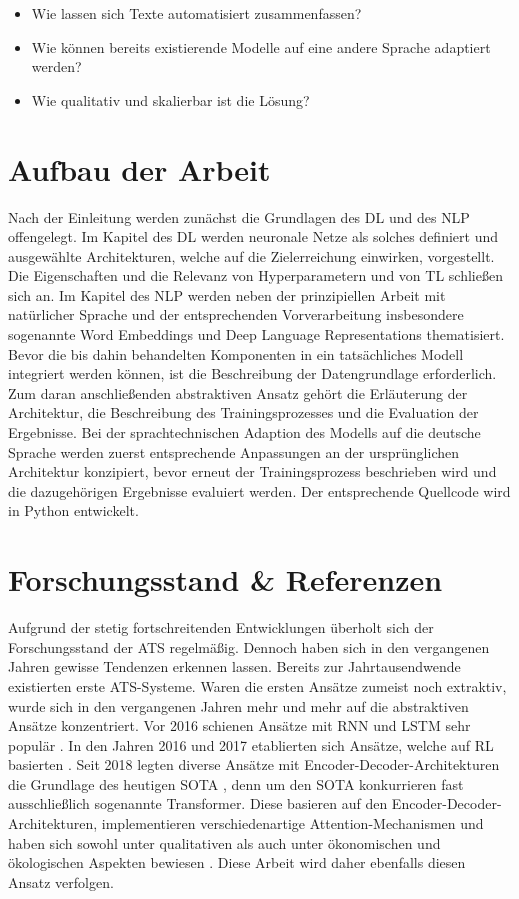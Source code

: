 \begin{itemize}
	\item Wie lassen sich Texte automatisiert zusammenfassen?
	\item Wie können bereits existierende Modelle auf eine andere Sprache adaptiert werden?
	\item Wie qualitativ und skalierbar ist die Lösung?
\end{itemize}
\newpage


\section{Aufbau der Arbeit}
\noindent
Nach der Einleitung werden zunächst die Grundlagen des \ac{DL} und des \ac{NLP} offengelegt. Im Kapitel des \ac{DL} werden neuronale Netze als solches definiert und ausgewählte Architekturen, welche auf die Zielerreichung einwirken, vorgestellt. Die Eigenschaften und die Relevanz von Hyperparametern und von \ac{TL} schließen sich an. Im Kapitel des \ac{NLP} werden neben der prinzipiellen Arbeit mit natürlicher Sprache und der entsprechenden Vorverarbeitung insbesondere sogenannte Word Embeddings und Deep Language Representations thematisiert.\\

\noindent
Bevor die bis dahin behandelten Komponenten in ein tatsächliches Modell integriert werden können, ist die Beschreibung der Datengrundlage erforderlich. Zum daran anschließenden abstraktiven Ansatz gehört die Erläuterung der Architektur, die Beschreibung des Trainingsprozesses und die Evaluation der Ergebnisse. Bei der sprachtechnischen Adaption des Modells auf die deutsche Sprache werden zuerst entsprechende Anpassungen an der ursprünglichen Architektur konzipiert, bevor erneut der Trainingsprozess beschrieben wird und die dazugehörigen Ergebnisse evaluiert werden. Der entsprechende Quellcode wird in Python entwickelt.


\section{Forschungsstand \& Referenzen}
\noindent
Aufgrund der stetig fortschreitenden Entwicklungen überholt sich der Forschungsstand der \ac{ATS} regelmäßig. Dennoch haben sich in den vergangenen Jahren gewisse Tendenzen erkennen lassen. Bereits zur Jahrtausendwende existierten erste \ac{ATS}-Systeme. Waren die ersten Ansätze zumeist noch extraktiv, wurde sich in den vergangenen Jahren mehr und mehr auf die abstraktiven Ansätze konzentriert. Vor 2016 schienen Ansätze mit \ac{RNN} und \ac{LSTM} sehr populär \cite{NAL16}. In den Jahren 2016 und 2017 etablierten sich Ansätze, welche auf \ac{RL} basierten \cite{PAU17}. Seit 2018 legten diverse Ansätze mit Encoder-Decoder-Architekturen die Grundlage des heutigen \ac{SOTA} \cite{YAN19, ROT20}, denn um den \ac{SOTA} konkurrieren fast ausschließlich sogenannte Transformer. Diese basieren auf den Encoder-Decoder-Architekturen, implementieren verschiedenartige Attention-Mechanismen und haben sich sowohl unter qualitativen als auch unter ökonomischen und ökologischen Aspekten bewiesen \cite{ZHA20}. Diese Arbeit wird daher ebenfalls diesen Ansatz verfolgen.\\

